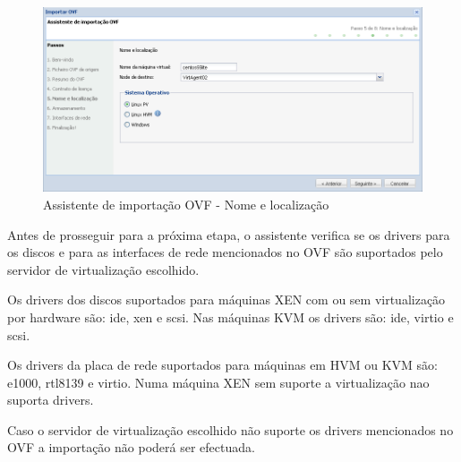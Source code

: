 \begin{description}
        \begin{figure}[H]
            \begin{center}
            \includegraphics[scale=0.5]{screenshots/ovf_import_name.png}
            \caption{Assistente de importação OVF - Nome e localização}
            \label{fig:ovf_import_name}
            \end{center}
        \end{figure}

        Antes de prosseguir para a próxima etapa, o assistente verifica se os drivers para os discos e para as interfaces de rede mencionados no OVF são suportados pelo servidor de virtualização escolhido.

        Os drivers dos discos suportados para máquinas XEN com ou sem virtualização por hardware são: ide, xen e scsi. Nas máquinas KVM os drivers são: ide, virtio e scsi.

        Os drivers da placa de rede suportados para máquinas em HVM ou KVM são: e1000, rtl8139 e virtio. Numa máquina XEN sem suporte a virtualização nao suporta drivers.

        Caso o servidor de virtualização escolhido não suporte os drivers mencionados no OVF a importação não poderá ser efectuada.



\end{description}
